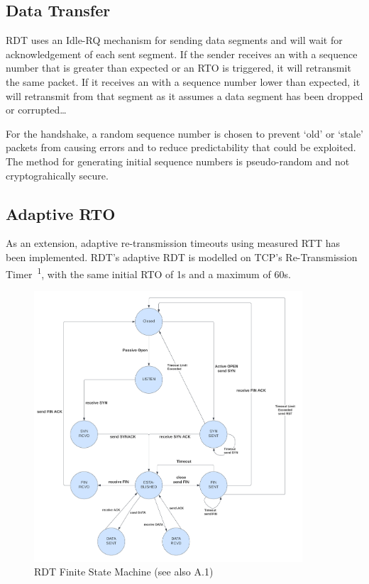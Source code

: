 \subsection{Data Transfer}

RDT uses an Idle-RQ mechanism for sending data segments and will wait for acknowledgement of each sent segment. If the sender receives an  with a sequence number that is greater than expected or an RTO is triggered, it will retransmit the same packet. If it receives an  with a sequence number lower than expected, it will retransmit from that segment as it assumes a data segment has been dropped or corrupted\dots

For the handshake, a random sequence number is chosen to prevent `old' or `stale' packets from causing errors and to reduce predictability that could be exploited. The method for generating initial sequence numbers is pseudo-random and not cryptograhically secure. 

\subsection{Adaptive RTO}\label{sec:RTO}
As an extension, adaptive re-transmission timeouts using measured RTT has been implemented. RDT's adaptive RDT is modelled on TCP's Re-Transmission Timer~\cite{rfc6298}\textsuperscript{1}, with the same initial RTO of 1s and a maximum of 60s.

\begin{figure}[H]
\begin{center}
    \includegraphics[width=100mm]{images/fsm.png}
\end{center}
\caption{RDT Finite State Machine (see also A.1)}\label{fig:fsm}
\end{figure}

